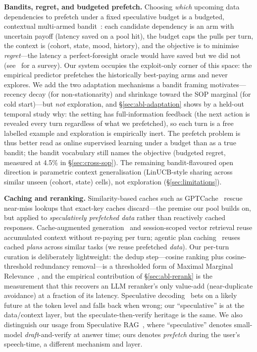 \documentclass[10pt,twocolumn]{article}
\begin{document}
\textbf{Bandits, regret, and budgeted prefetch.} Choosing \emph{which} upcoming data dependencies to prefetch under a fixed speculative budget is a budgeted, contextual multi-armed bandit~\cite{lairobbins1985,auer2002,licontextual2010,bwk2018}: each candidate dependency is an arm with uncertain payoff (latency saved on a pool hit), the budget caps the pulls per turn, the context is (cohort, state, mood, history), and the objective is to minimise \emph{regret}---the latency a perfect-foresight oracle would have saved but we did not (see~\cite{slivkins2019} for a survey). Our system occupies the exploit-only corner of this space: the empirical predictor prefetches the historically best-paying arms and never explores. We add the two adaptation mechanisms a bandit framing motivates---recency decay (for non-stationarity) and shrinkage toward the SOP marginal (for cold start)---but \emph{not} exploration, and \S\ref{sec:abl-adaptation} shows by a held-out temporal study why: the setting has full-information feedback (the next action is revealed every turn regardless of what we prefetched), so each turn is a free labelled example and exploration is empirically inert. The prefetch problem is thus better read as online supervised learning under a budget than as a true bandit; the bandit vocabulary still names the objective (budgeted regret, measured at 4.5\% in \S\ref{sec:cross-sop}). The remaining bandit-flavoured open direction is parametric context generalisation (LinUCB-style sharing across similar unseen (cohort, state) cells), not exploration (\S\ref{sec:limitations}).

\textbf{Caching and reranking.} Similarity-based caches such as GPTCache~\cite{gptcache2023} rescue near-miss lookups that exact-key caches discard---the premise our pool builds on, but applied to \emph{speculatively prefetched data} rather than reactively cached responses. Cache-augmented generation~\cite{cag2024} and session-scoped vector retrieval reuse accumulated context without re-paying per turn; agentic plan caching~\cite{plancache2025} reuses cached \emph{plans} across similar tasks (we reuse prefetched \emph{data}). Our per-turn curation is deliberately lightweight: the dedup step---cosine ranking plus cosine-threshold redundancy removal---is a thresholded form of Maximal Marginal Relevance~\cite{mmr1998}, and the empirical contribution of \S\ref{sec:abl-rerank} is the measurement that this recovers an LLM reranker's only value-add (near-duplicate avoidance) at a fraction of its latency. Speculative decoding~\cite{speculativedecoding2023} bets on a likely future at the token level and falls back when wrong; our ``speculative'' is at the data/context layer, but the speculate-then-verify heritage is the same. We also distinguish our usage from Speculative RAG~\cite{specrag2024}, where ``speculative'' denotes small-model \emph{draft}-and-verify at answer time; ours denotes \emph{prefetch} during the user's speech-time, a different mechanism and layer.
\end{document}
